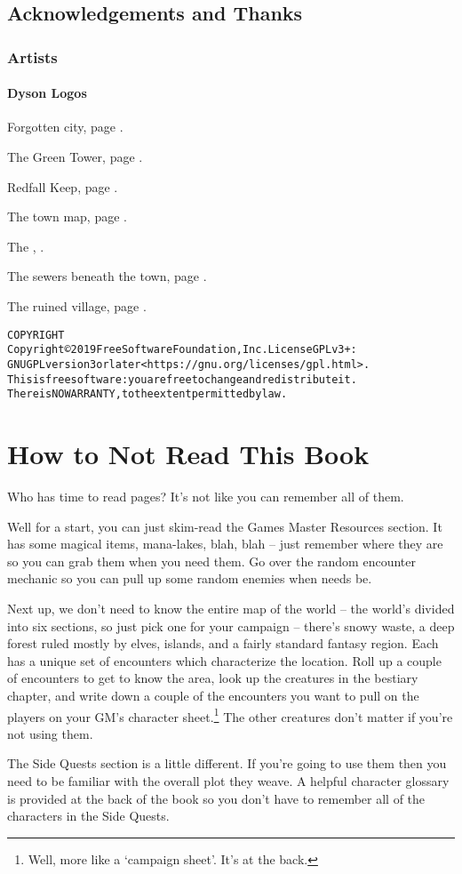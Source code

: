 
\section*{Acknowledgements and Thanks}

\subsection*{Artists}

\subsubsection{Dyson Logos}

Forgotten city, page \pageref{lost_city_map}.

The Green Tower, page \pageref{green_tower_map}.

Redfall Keep, page \pageref{redfall_keep_map}.

The town map, page \pageref{town_map}.

The , \pageref{mincing_pig_map}.

The sewers beneath the town, page \pageref{sewer_map}.

The ruined village, page \pageref{ruined_village_map}.

\begin{alltt}
COPYRIGHT
       Copyright \copyright 2019 Free Software Foundation, Inc.  License GPLv3+:
	GNU GPL version 3 or later <https://gnu.org/licenses/gpl.html>.
       This is free software: you are free to change and redistribute it.
	There is NO WARRANTY, to the extent permitted by law.

\end{alltt}


\chapter*{How to Not Read This Book}

Who has time to read \pageref{lastpage} pages?  It's not like you can remember all of them.

Well for a start, you can just skim-read the Games Master Resources section.  It has some magical items, mana-lakes, blah, blah -- just remember where they are so you can grab them when you need them.  Go over the random encounter mechanic so you can pull up some random enemies when needs be.

Next up, we don't need to know the entire map of the world -- the world's divided into six sections, so just pick one for your campaign -- there's snowy waste, a deep forest ruled mostly by elves, islands, and a fairly standard fantasy region.  Each has a unique set of encounters which characterize the location.  Roll up a couple of encounters to get to know the area, look up the creatures in the bestiary chapter, and write down a couple of the encounters you want to pull on the players on your GM's character sheet.\footnote{Well, more like a `campaign sheet'.  It's at the back.}  The other creatures don't matter if you're not using them.

The Side Quests section is a little different.  If you're going to use them then you need to be familiar with the overall plot they weave.  A helpful character glossary is provided at the back of the book so you don't have to remember all of the characters in the Side Quests.


